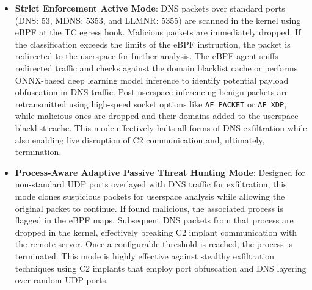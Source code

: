 \documentclass [11pt, proquest] {uwthesis}[2020/02/24]
\begin{document}
\begin{itemize}[itemsep=1pt,parsep=0pt]
    \item \textbf{Strict Enforcement Active Mode}: DNS packets over standard ports (DNS: 53, MDNS: 5353, and LLMNR: 5355) are scanned in the kernel using eBPF at the TC egress hook. Malicious packets are immediately dropped. If the classification exceeds the limits of the eBPF instruction, the packet is redirected to the userspace for further analysis. The eBPF agent sniffs redirected traffic and checks against the domain blacklist cache or performs ONNX-based deep learning model inference to identify potential payload obfuscation in DNS traffic. Post-userspace inferencing benign packets are retransmitted using high-speed socket options like \texttt{AF\_PACKET} or \texttt{AF\_XDP}, while malicious ones are dropped and their domains added to the userspace blacklist cache. This mode effectively halts all forms of DNS exfiltration while also enabling live disruption of C2 communication and, ultimately, termination.
    
    \item \textbf{Process-Aware Adaptive Passive Threat Hunting Mode}: Designed for non-standard UDP ports overlayed with DNS traffic for exfiltration, this mode clones suspicious packets for userspace analysis while allowing the original packet to continue. If found malicious, the associated process is flagged in the eBPF maps. Subsequent DNS packets from that process are dropped in the kernel, effectively breaking C2 implant communication with the remote server. Once a configurable threshold is reached, the process is terminated. This mode is highly effective against stealthy exfiltration techniques using C2 implants that employ port obfuscation and DNS layering over random UDP ports. 
\end{itemize}
\end{document}
